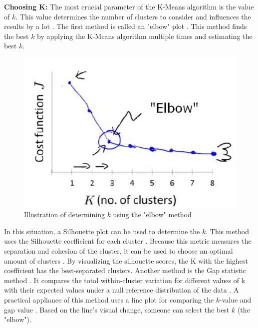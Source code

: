 \textbf{Choosing K:} The most crucial parameter of the K-Means algorithm is the value of $k$.
This value determines the number of clusters to consider and influences the results by a lot \citep{ahmed_k-means_2020}.
The first method is called an "elbow" plot \citep{kodinariya_review_2013}.
This method finds the best $k$ by applying the K-Means algorithm multiple times and estimating the best $k$.
\begin{figure}[H]
  \includegraphics{TheorethicalFramework/dentification-of-Elbow-point.png}
  \caption{Illustration of determining $k$ using the "elbow" method \citep{kodinariya_review_2013}}
\end{figure}
In this situation, a Silhouette plot can be used to determine the $k$.
This method uses the Silhouette coefficient for each cluster \citep{saputra_effect_2020}.
Because this metric measures the separation and cohesion of the cluster, it can be used to choose an optimal amount of clusters \citep{saputra_effect_2020}.
By visualizing the silhouette scores, the K with the highest coefficient has the best-separated clusters. \newline
Another method is the Gap statistic method \citep{yuan_research_2019}.
It compares the total within-cluster variation for different values of k with their expected values under a null reference distribution of the data \citep{tibshirani_estimating_2001}.
A practical appliance of this method uses a line plot for comparing the $k$-value and gap value \citep{yuan_research_2019}.
Based on the line's visual change, someone can select the best $k$ (the "elbow").

